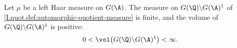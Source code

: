 Let $\mu$ be a left Haar measure on $G(\A)$. The measure on $G(\Q)\backslash G(\A)^1$ of
\cref{I.quot.def:automorphic-quotient-measure} is finite, and the volume of $G(\Q)\backslash G(\A)^1$ is positive:
\[
  0<\vol\bigl(G(\Q)\backslash G(\A)^1\bigr)<\infty.
\]

